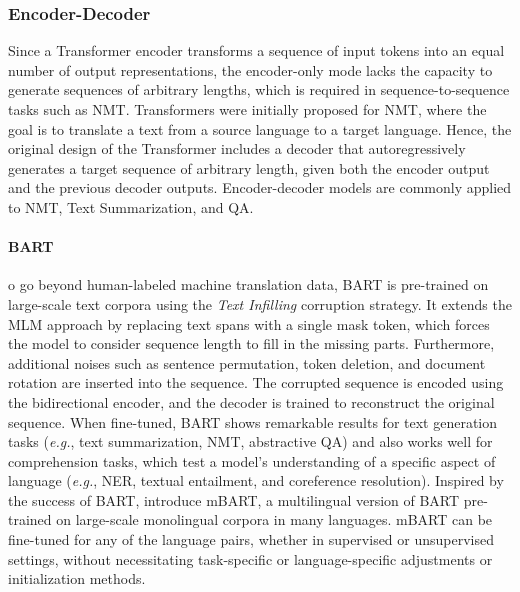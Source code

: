 \subsubsection{Encoder-Decoder}


Since a Transformer encoder transforms a sequence of input tokens into an equal number of output representations, the encoder-only mode lacks the capacity to generate sequences of arbitrary lengths, which is required in sequence-to-sequence tasks such as \ac{NMT}. Transformers were initially proposed for \ac{NMT}, where the goal is to translate a text from a source language to a target language. Hence, the original design of the Transformer includes a decoder that autoregressively generates a target sequence of arbitrary length, given both the encoder output and the previous decoder outputs. Encoder-decoder models are commonly applied to \ac{NMT}, Text Summarization, and \ac{QA}.

\paragraph{BART}

o go beyond human-labeled machine translation data, \ac{BART} is pre-trained on large-scale text corpora using the \textit{Text Infilling} corruption strategy. It extends the \ac{MLM} approach by replacing text spans with a single mask token, which forces the model to consider sequence length to fill in the missing parts. Furthermore, additional noises such as sentence permutation, token deletion, and document rotation are inserted into the sequence. The corrupted sequence is encoded using the bidirectional encoder, and the decoder is trained to reconstruct the original sequence. When fine-tuned, \ac{BART} shows remarkable results for text generation tasks (\textit{e.g.}, text summarization, \ac{NMT}, abstractive \ac{QA}) and also works well for comprehension tasks, which test a model's understanding of a specific aspect of language (\textit{e.g.}, \ac{NER}, textual entailment, and coreference resolution). Inspired by the success of \ac{BART}, \citet{liu2020multilingual} introduce mBART, a multilingual version of \ac{BART} pre-trained on large-scale monolingual corpora in many languages. mBART can be fine-tuned for any of the language pairs, whether in supervised or unsupervised settings, without necessitating task-specific or language-specific adjustments or initialization methods.

